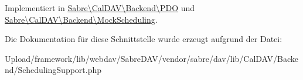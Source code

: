 Implementiert in \mbox{\hyperlink{class_sabre_1_1_cal_d_a_v_1_1_backend_1_1_p_d_o_a5b4d2c074e5e46b44d3a439ae94d7fd8}{Sabre\textbackslash{}\+Cal\+D\+A\+V\textbackslash{}\+Backend\textbackslash{}\+P\+DO}} und \mbox{\hyperlink{class_sabre_1_1_cal_d_a_v_1_1_backend_1_1_mock_scheduling_a3c4759a7ce8f76a5dc15319cf15c5031}{Sabre\textbackslash{}\+Cal\+D\+A\+V\textbackslash{}\+Backend\textbackslash{}\+Mock\+Scheduling}}.



Die Dokumentation für diese Schnittstelle wurde erzeugt aufgrund der Datei\+:\begin{DoxyCompactItemize}
\item 
Upload/framework/lib/webdav/\+Sabre\+D\+A\+V/vendor/sabre/dav/lib/\+Cal\+D\+A\+V/\+Backend/Scheduling\+Support.\+php\end{DoxyCompactItemize}
